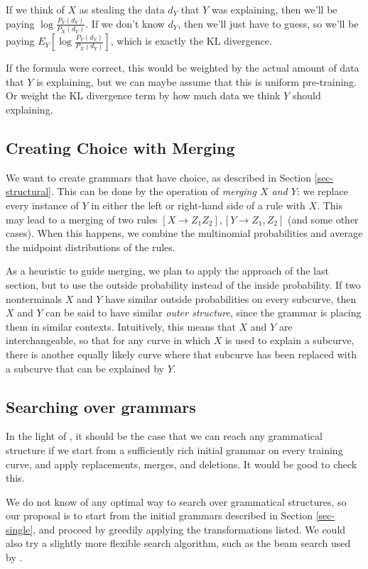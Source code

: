 If we think of $X$ as stealing the data $d_Y$ that $Y$ was explaining,
then we'll be paying $\log \frac{P_Y(d_Y)}{P_X(d_Y)}$. If we don't
know $d_Y$, then we'll just have to guess, so we'll be paying $E_Y
\left[ \log \frac{P_Y(d_Y)}{P_X(d_Y)} \right]$, which is exactly the
KL divergence.

If the formula were correct, this would be weighted by the actual
amount of data that $Y$ is explaining, but we can maybe assume that
this is uniform pre-training. Or weight the KL divergence term by how
much data we think $Y$ should explaining.

\subsection{Creating Choice with Merging}
\label{sec-merge}

We want to create grammars that have choice, as described in Section
\ref{sec-structural}. This can be done by the operation of \emph{merging $X$ and
  $Y$}: we replace every instance of $Y$ in either the left or
right-hand side of a rule with $X$. This may lead to a merging of two
rules $[X \to Z_1 Z_2], [Y\to Z_1,Z_2]$ (and some other cases). When
this happens, we combine the multinomial probabilities and average the
midpoint distributions of the rules.

As a heuristic to guide merging, we plan to apply the approach of the
last section, but to use the outside probability instead of the inside
probability. If two nonterminals $X$ and $Y$ have similar outside
probabilities on every subcurve, then $X$ and $Y$ can be said to have
similar \emph{outer structure}, since the grammar is placing them in
similar contexts. Intuitively, this means that $X$ and $Y$ are
interchangeable, so that for any curve in which $X$ is used to explain
a subcurve, there is another equally likely curve where that subcurve
has been replaced with a subcurve that can be explained by $Y$.

\subsection{Searching over grammars}

In the light of \cite{stolcke}, it should be the case that we can
reach any grammatical structure if we start from a sufficiently rich
initial grammar on every training curve, and apply replacements,
merges, and deletions. It would be good to check this.

We do not know of any optimal way to search over grammatical
structures, so our proposal is to start from the initial grammars
described in Section \ref{sec-single}, and proceed by greedily applying the
transformations listed. We could also try a slightly more flexible
search algorithm, such as the beam search used by \cite{stolcke}.


